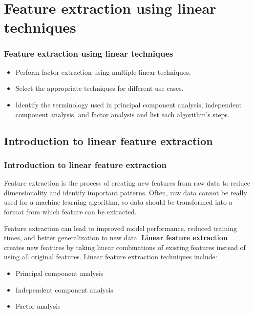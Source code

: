 \documentclass[8pt,dvipsnames]{beamer}
\begin{document}
\section{Feature extraction using linear techniques}
\begin{frame}
    \frametitle{Feature extraction using linear techniques}
    \begin{itemize}
        \item Perform factor extraction using multiple linear techniques.
        \item Select the appropriate techniques for different use cases.
        \item Identify the terminology used in principal component analysis, independent component analysis, and factor analysis and list each algorithm's steps.
    \end{itemize}
\end{frame}
\subsection{Introduction to linear feature extraction}
\begin{frame}
    \frametitle{Introduction to linear feature extraction}
    Feature extraction is the process of creating new features from raw data to reduce dimensionality and identify important patterns. Often, raw data cannot be really used for a machine learning algorithm, so data should be transformed into a format from which feature can be extracted.

    Feature extraction can lead to improved model performance, reduced training times, and better generalization to new data. \textbf{Linear feature extraction} creates new features by taking linear combinations of existing features instead of using all original features. Linear feature extraction techniques include:
    \begin{itemize}
        \item Principal component analysis
        \item Independent component analysis
        \item Factor analysis
    \end{itemize}
\end{frame}
\end{document}
